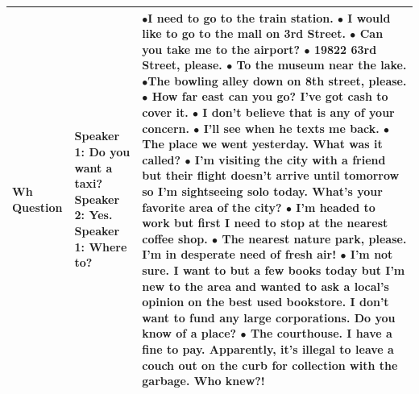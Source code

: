 \documentclass[11pt]{article}
\begin{document}
\begin{longtable}{|p{2cm}|p{3cm}|p{10cm}|}
 Wh Question & \textbf{Speaker 1:} Do you want a taxi? \newline \hspace*{0.5cm} \textbf{Speaker 2:} Yes. \newline \textbf{Speaker 1:} Where to? &  $\bullet$I need to go to the train station.  \newline $\bullet$ I would like to go to the mall on 3rd Street.  \newline $\bullet$ Can you take me to the airport?  \newline $\bullet$ 19822 63rd Street, please.  \newline $\bullet$ To the museum near the lake. \newline \newline $\bullet$The bowling alley down on 8th street, please. \newline $\bullet$ How far east can you go? I've got cash to cover it. \newline $\bullet$ I don't believe that is any of your concern. \newline $\bullet$ I'll see when he texts me back. \newline $\bullet$The place we went yesterday. What was it called? \newline \newline $\bullet$  I'm visiting the city with a friend but their flight doesn't arrive until tomorrow so I'm sightseeing solo today. What's your favorite area of the city? \newline $\bullet$ I'm headed to work but first I need to stop at the nearest coffee shop. \newline $\bullet$ The nearest nature park, please. I'm in desperate need of fresh air! \newline $\bullet$  I'm not sure. I want to but a few books today but I'm new to the area and wanted to ask a local's opinion on the best used bookstore. I don't want to fund any large corporations. Do you know of a place? \newline $\bullet$ The courthouse. I have a fine to pay. Apparently, it's illegal to leave a couch out on the curb for collection with the garbage. Who knew?!\\\hline

\end{longtable}
\end{document}
